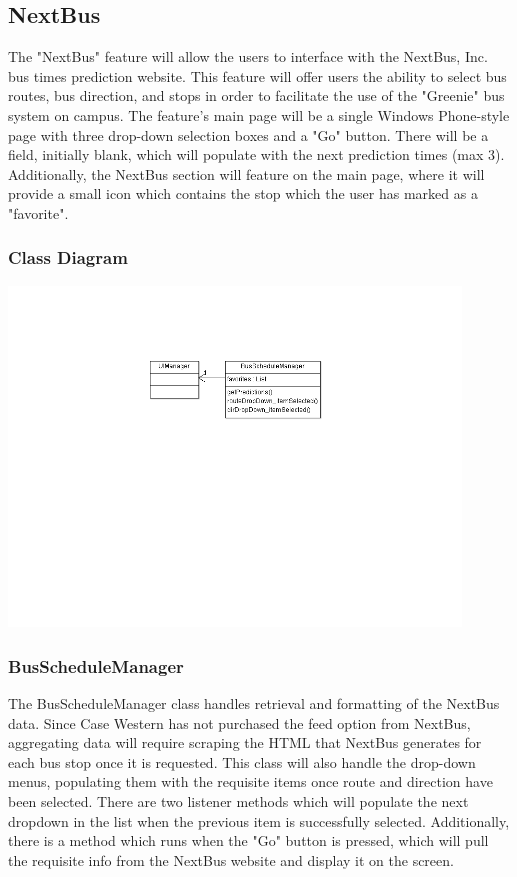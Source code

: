 \documentclass[pdftex,12pt,letter]{article}
\begin{document}
\subsection{NextBus}
The "NextBus" feature will allow the users to interface with the NextBus, Inc. bus times prediction website. This feature will offer users the ability to select bus routes, bus direction, and stops in order to facilitate the use of the "Greenie" bus system on campus. The feature's main page will be a single Windows Phone-style page with three drop-down selection boxes and a "Go" button. There will be a field, initially blank, which will populate with the next prediction times (max 3). Additionally, the NextBus section will feature on the main page, where it will provide a small icon which contains the stop which the user has marked as a "favorite".
\subsubsection{Class Diagram}
\begin{flushleft}
\includegraphics[width=120mm]{nextbusCD.png}
\end{flushleft}
\subsubsection{BusScheduleManager}
The BusScheduleManager class handles retrieval and formatting of the NextBus data. Since Case Western has not purchased the feed option from NextBus, aggregating data will require scraping the HTML that NextBus generates for each bus stop once it is requested. This class will also handle the drop-down menus, populating them with the requisite items once route and direction have been selected. There are two listener methods which will populate the next dropdown in the list when the previous item is successfully selected. Additionally, there is a method which runs when the "Go" button is pressed, which will pull the requisite info from the NextBus website and display it on the screen.
\end{document}
